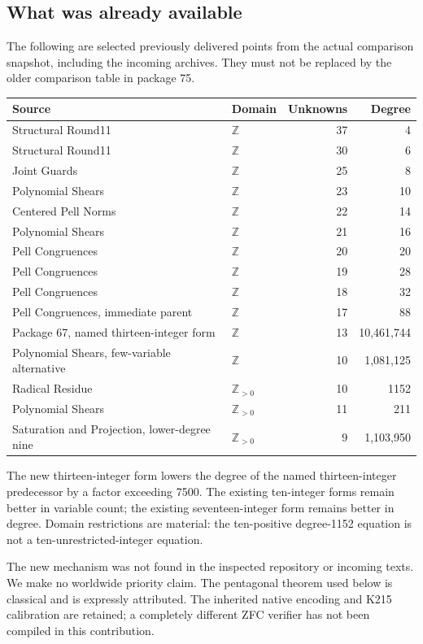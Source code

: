 \documentclass[11pt]{article}
\theoremstyle{remark}\newtheorem{remark}[theorem]{Remark}
\newcommand{\Z}{\mathbb Z}\newcommand{\Q}{\mathbb Q}\newcommand{\N}{\mathbb N}
\begin{document}
\subsection{What was already available}
The following are selected previously delivered points from the actual
comparison snapshot, including the incoming archives. They must not be
replaced by the older comparison table in package 75.
\begin{center}\small
\begin{tabular}{@{}llrr@{}}\toprule
Source & Domain & Unknowns & Degree\\\midrule
Structural Round11 & $\Z$ & 37 & 4\\
Structural Round11 & $\Z$ & 30 & 6\\
Joint Guards & $\Z$ & 25 & 8\\
Polynomial Shears & $\Z$ & 23 & 10\\
Centered Pell Norms & $\Z$ & 22 & 14\\
Polynomial Shears & $\Z$ & 21 & 16\\
Pell Congruences & $\Z$ & 20 & 20\\
Pell Congruences & $\Z$ & 19 & 28\\
Pell Congruences & $\Z$ & 18 & 32\\
Pell Congruences, immediate parent & $\Z$ & 17 & 88\\
Package 67, named thirteen-integer form & $\Z$ & 13 & 10,461,744\\
Polynomial Shears, few-variable alternative & $\Z$ & 10 & 1,081,125\\\midrule
Radical Residue & $\Z_{>0}$ & 10 & 1152\\
Polynomial Shears & $\Z_{>0}$ & 11 & 211\\
Saturation and Projection, lower-degree nine & $\Z_{>0}$ & 9 & 1,103,950\\\bottomrule
\end{tabular}
\end{center}
The new thirteen-integer form lowers the degree of the named thirteen-integer
predecessor by a factor exceeding 7500. The existing ten-integer forms remain
better in variable count; the existing seventeen-integer form remains better
in degree. Domain restrictions are material: the ten-positive degree-1152
equation is not a ten-unrestricted-integer equation.

The new mechanism was not found in the inspected repository or incoming
texts. We make no worldwide priority claim. The pentagonal theorem used
below is classical and is expressly attributed. The inherited native
encoding and K215 calibration are retained; a completely different ZFC
verifier has not been compiled in this contribution.
\end{document}
